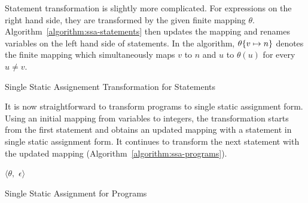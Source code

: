 Statement transformation is slightly more complicated. For
expressions on the right hand side, they are transformed by the given
finite mapping $\theta$. Algorithm~\ref{algorithm:ssa-statements} then
updates the mapping and renames variables on the left hand side of
statements. In the algorithm, $\theta\{{v} \mapsto {n}\}$
denotes the finite mapping which simultaneously maps $v$ to
$n$ and $u$ to $\theta(u)$ for every $u \neq v$.

\begin{algorithm}
  \begin{algorithmic}[1]
      \EndCase
      \EndCase
    \EndMatch
    \EndFunction
  \end{algorithmic}
  \caption{Single Static Assignement Transformation for Statements}
  \label{algorithm:ssa-statements}
\end{algorithm}

It is now straightforward to transform programs to single static
assignment form. Using an initial mapping from variables to integers,
the transformation starts from the first statement and obtains an
updated mapping with a statement in single static assignment form. It
continues to transform the next statement with the updated mapping
(Algorithm~\ref{algorithm:ssa-programs}). 

\begin{algorithm}
  \begin{algorithmic}[1]
      \Case{$\epsilon$}
        \Return $\langle \theta,$ $\epsilon \rangle$
      \EndCase
      \EndCase
    \EndMatch
    \EndFunction
  \end{algorithmic}
  \caption{Single Static Assignment for Programs}
  \label{algorithm:ssa-programs}
\end{algorithm}

